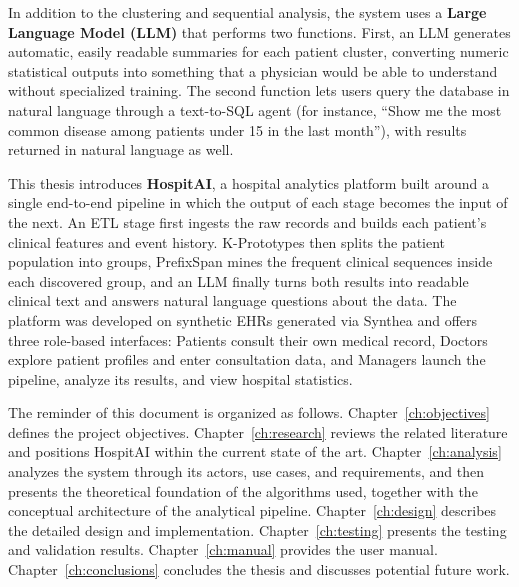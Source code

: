 In addition to the clustering and sequential analysis, the system uses a \textbf{Large Language Model (LLM)} that performs two functions.
First, an LLM generates automatic, easily readable summaries for each patient cluster, converting numeric statistical outputs into something that a physician would be able to understand without specialized training.
The second function lets users query the database in natural language through a text-to-SQL agent (for instance, ``Show me the most common disease among patients under 15 in the last month''), with results returned in natural language as well.

This thesis introduces \textbf{HospitAI}, a hospital analytics platform built around a single end-to-end pipeline in which the output of each stage becomes the input of the next. An ETL stage first ingests the raw records and builds each patient's clinical features and event history. K-Prototypes then splits the patient population into groups, PrefixSpan mines the frequent clinical sequences inside each discovered group, and an LLM finally turns both results into readable clinical text and answers natural language questions about the data.
The platform was developed on synthetic EHRs generated via Synthea and offers three role-based interfaces: Patients consult their own medical record, Doctors explore patient profiles and enter consultation data, and Managers launch the pipeline, analyze its results, and view hospital statistics.

The reminder of this document is organized as follows.
Chapter~\ref{ch:objectives} defines the project objectives.
Chapter~\ref{ch:research} reviews the related literature and positions HospitAI within the current state of the art.
Chapter~\ref{ch:analysis} analyzes the system through its actors, use cases, and requirements, and then presents the theoretical foundation of the algorithms used, together with the conceptual architecture of the analytical pipeline.
Chapter~\ref{ch:design} describes the detailed design and implementation.
Chapter~\ref{ch:testing} presents the testing and validation results.
Chapter~\ref{ch:manual} provides the user manual.
Chapter~\ref{ch:conclusions} concludes the thesis and discusses potential future work.